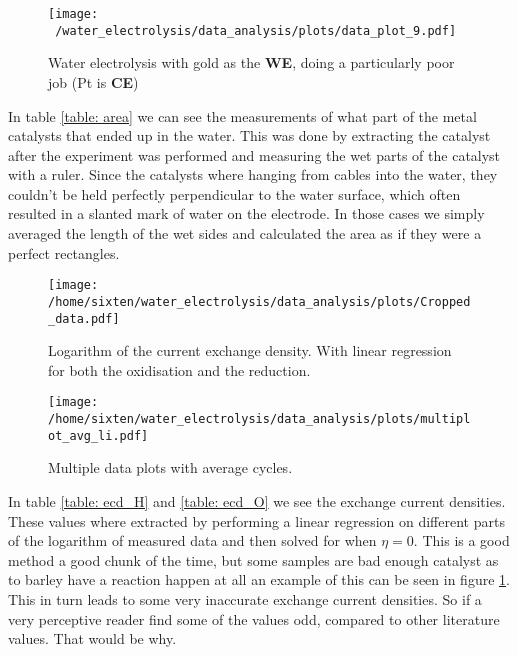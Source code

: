 \documentclass[twocolumn]{revtex4-2}
\begin{document}
\begin{figure}[h]
	\texttt{[image: ~/water\_electrolysis/data\_analysis/plots/data\_plot\_9.pdf]}
	
	\caption{Water electrolysis with gold as the \textbf{WE}, doing a particularly poor job (Pt 
	is \textbf{CE})\label{figure: Au_Pt_current}}
\end{figure}

In table \ref{table: area} we can see the measurements of what part of the metal catalysts
that ended up in the water. This was done by extracting the catalyst after the experiment
was performed and measuring the wet parts of the catalyst with a ruler. Since the catalysts 
where hanging from cables into the water, they couldn't be held perfectly perpendicular to 
the water surface, which often resulted in a slanted mark of water on the electrode.
In those cases we simply averaged the length of the wet sides and calculated the area as 
if they were a perfect rectangles. 


\begin{figure*}[t]
	\centering
	\begin{minipage}{0.45\linewidth}
	\texttt{[image: /home/sixten/water\_electrolysis/data\_analysis/plots/Cropped\_data.pdf]}
	\caption{Logarithm of the current exchange density. With linear regression for both 
	the oxidisation and the reduction.\label{figure: CD_plat}}
	\end{minipage}
	\begin{minipage}{0.45\linewidth}
	\texttt{[image: /home/sixten/water\_electrolysis/data\_analysis/plots/multiplot\_avg\_li.pdf]}
	\caption{Multiple data plots with average cycles. \label{figure: Average cycle}}
	\end{minipage}
\end{figure*}
In table \ref{table: ecd_H} and \ref{table: ecd_O} we see the exchange current densities.
These values where extracted by performing a linear regression on 
different parts of the logarithm of measured data and then solved for when $\eta = 0$. This is a good method a good chunk of the 
time, but some samples are bad enough catalyst as to barley 
have a reaction happen at all an example of this can be seen in figure \ref{figure: Au_Pt_current}.
This in turn leads to some very inaccurate exchange current densities. So if 
a very perceptive reader find some of the values odd, compared to other literature values. That would
be why.
\end{document}
